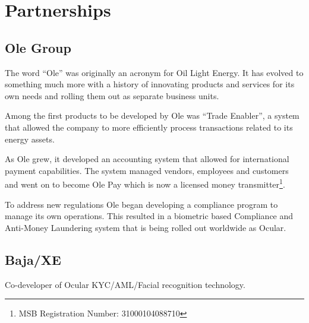 \documentclass[12pt]{article}
\begin{document}
\section{Partnerships}
\subsection{Ole Group}
The word “Ole” was originally an acronym for Oil Light Energy. It has evolved to something much more with a history of innovating products and services for its own needs and rolling them out as separate business units.
 
Among the first products to be developed by Ole was “Trade Enabler”, a system that allowed the company to more efficiently process transactions related to its energy assets.

As Ole grew, it developed an accounting system that allowed for international payment capabilities. The system managed vendors, employees and customers and went on to become Ole Pay which is now a licensed money transmitter\footnote{MSB Registration Number: 31000104088710}. 

To address new regulations Ole began developing a compliance program to manage its own operations. This resulted in a biometric based Compliance and Anti-Money Laundering system that is being rolled out worldwide as Ocular.

\subsection{Baja/XE}

Co-developer of Ocular KYC/AML/Facial recognition technology.   
\end{document}

